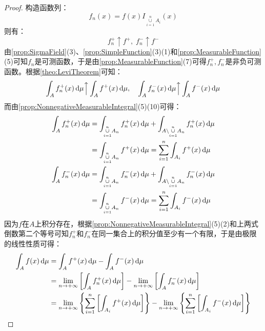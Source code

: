 \begin{proof}
	构造函数列：
	\begin{equation*}
		f_n(x)=f(x)I_{\underset{i=1}{\overset{n}{\cup}}A_i}(x)
	\end{equation*}
	则有：
	\begin{equation*}
		f_n^+\uparrow f^+,\;f_n^-\uparrow f^-
	\end{equation*}
	由\cref{prop:SigmaField}(3)、\cref{prop:SimpleFunction}(3)(1)和\cref{prop:MeasurableFunction}(5)可知$f_n$是可测函数，于是由\cref{prop:MeasurableFunction}(7)可得$f_n^+,f_n^-$是非负可测函数。根据\cref{theo:LeviTheorem}可知：
	\begin{equation*}
		\int_{A}f_n^+(x)\mathop{}\!\mathrm{d}\mu\Big\uparrow\int_{A}f^+(x)\mathop{}\!\mathrm{d}\mu,\quad\int_{A}f_n^-(x)\mathop{}\!\mathrm{d}\mu\Big\uparrow\int_{A}f^-(x)\mathop{}\!\mathrm{d}\mu
	\end{equation*}
	而由\cref{prop:NonnegativeMeasurableIntegral}(5)(10)可得：
	\begin{gather*}
		\begin{aligned}
			\int_{A}f_n^+(x)\dif\mu
			&=\int_{\underset{i=1}{\overset{n}{\cup}}A_n}f_n^+(x)\dif\mu+\int_{A\backslash\underset{i=1}{\overset{n}{\cup}}A_n}f_n^+(x)\dif\mu \\
			&=\int_{\underset{i=1}{\overset{n}{\cup}}A_n}f^+(x)\dif\mu
			=\sum_{i=1}^{n}\int_{A_i}f^+(x)\dif\mu
		\end{aligned} \\
		\begin{aligned}
			\int_{A}f_n^-(x)\dif\mu
			&=\int_{\underset{i=1}{\overset{n}{\cup}}A_n}f_n^-(x)\dif\mu+\int_{A\backslash\underset{i=1}{\overset{n}{\cup}}A_n}f_n^-(x)\dif\mu \\
			&=\int_{\underset{i=1}{\overset{n}{\cup}}A_n}f^-(x)\dif\mu
			=\sum_{i=1}^{n}\int_{A_i}f^-(x)\dif\mu
		\end{aligned} 
	\end{gather*}
	因为$f$在$A$上积分存在，根据\cref{prop:NonnegativeMeasurableIntegral}(5)(2)和上两式倒数第二个等号可知$f_n^+$和$f_n^-$在同一集合上的积分值至少有一个有限，于是由极限的线性性质可得：
	\begin{align*}
		\int_{A}f(x)\dif\mu&=\int_{A}f^+(x)\dif\mu-\int_{A}f^-(x)\dif\mu \\
		&=\lim_{n\to+\infty}\left[\int_{A}f_n^+(x)\dif\mu\right]-\lim_{n\to+\infty}\left[\int_{A}f_n^-(x)\dif\mu\right] \\
		&=\lim_{n\to+\infty}\left\{\sum_{i=1}^{n}\left[\int_{A_i}f^+(x)\dif\mu\right]\right\}-\lim_{n\to+\infty}\left\{\sum_{i=1}^{n}\left[\int_{A_i}f^-(x)\dif\mu\right]\right\} \\

\end{align*}
\end{proof}
